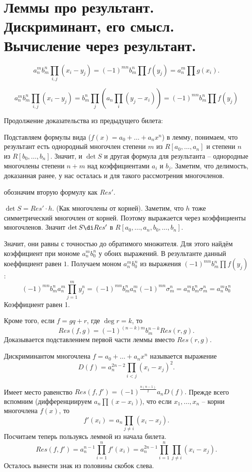 \section{
 Леммы про результант. Дискриминант, его смысл. Вычисление через результант.
}

\lm  $$a_n^mb_m^n \prod_{i,j} (x_i-y_j)=(-1)^{mn}b_m^n \prod f(y_j)=a_n^m \prod g(x_i).$$ 
\elm

\proof
$$a_n^mb_m^n \prod_{i,j} (x_i-y_j) = b_m^n \prod_j (a_n \prod_i (y_j - x_i)) = (-1)^{mn}b_m^n \prod f(y_j)$$
\endproof

Продолжение доказательства из предыдущего билета:

Подставляем формулы вида ($f(x)=a_0+\dots+a_nx^n$) в лемму, понимаем, что результант есть однородный многочлен степени $m$ из $R[a_0, \ldots, a_n]$ и степени $n$ из
$R[b_0, \ldots, b_n]$. Значит, и $\det S$ и другая формула для результанта -- однородные многочлены степени $n+m$ над коэффициентами $a_i$ и $b_j$. 
Заметим, что делимость, доказанная ранее, у нас осталась и для такого рассмотрения многочленов.

\proof обозначим вторую формулу как $Res'$.

$\det S = Res' \cdot h$. (Как многочлены от корней). Заметим, что $h$ тоже симметрический многочлен от корней. Поэтому выражается через коэффициенты многочленов.
Значит $\det S \di Res'$ в $R[a_0, \ldots, a_n, b_0, \ldots, b_n]$.
\endproof

Значит, они равны с точностью до обратимого множителя. Для этого найдём коэффициент при мономе $a_n^m b_0^n$ у обоих выражений. 
В результанте данный коеффициент равен $1$. Получаем моном $a_n^m b_0^n$ из выражения $(-1)^{mn}b_m^n \prod f(y_j)$:
$$(-1)^{mn}b_m^n a_n^m \prod_{j=1}^m y_j^n = (-1)^{mn} b_m^n a_n^m (-1)^{mn} \sigma_m^n = a_n^m b_m^n \sigma_m^n = a_n^m b_0^n$$
Коэффициент равен 1.

\hfill
\hfill

\bupr Кроме того, если $f=gq+r$, где $\deg r=k$, то 
 $$Res(f,g)=(-1)^{(n-k)m}b_m^{n-k} Res(r,g).$$
 \proof
    Доказывается подставлением первой части леммы вместо $Res(r, g)$.
 \endproof
 \eupr

\dfn Дискриминантом многочлена $f=a_0+\dots +a_nx^n$ называется выражение 
$$D(f)=a_n^{2n-2}\prod_{i < j} (x_i-x_j)^2.$$
\edfn

\lm Имеет место равенство $Res(f,f')=(-1)^{\frac{n(n-1)}{2}} a_n D(f).$
\proof Прежде всего вспомним (дифференциируем $a_n \prod (x - x_i)$), что если $x_1,\dots,x_n$ -- корни многочлена $f(x)$, то $$f'(x_i)=a_n\prod_{j \neq i}(x_i-x_j).$$
Посчитаем теперь пользуясь леммой из начала билета.
$$Res(f,f')= a_n^{n-1}\prod_{i=1}^n f'(x_i)=a_n^{2n-1} \prod_{i=1}^n \prod_{j\neq i} (x_i-x_j).$$
Осталось вынести знак из половины скобок слева.
\endproof
\elm

